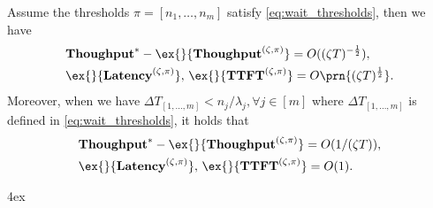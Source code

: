 \documentclass[opre,dblanonrev]{informs4}
\let\enotesize=\normalsize
\newcommand{\throughput}{\textbf{Thoughput}}
\newcommand{\Latency}{\textbf{Latency}}
\newcommand{\TTFT}{\textbf{TTFT}}
\begin{document}
\begin{theorem}
\label{thm:wait_heavy_traffic}
    Assume the thresholds $\pi=[n_1,\dots,n_m]$ satisfy \eqref{eq:wait_thresholds}, then we have 
$$
\begin{aligned}
    &\throughput^*-\ex{}{\throughput^{(\zeta,\pi)}}=O((\zeta T)^{-\frac{1}{2}}),\\ 
&\ex{}{\Latency^{(\zeta,\pi)}},\,\ex{}{\TTFT^{(\zeta,\pi)}}=O\prn{(\zeta T)^{\frac{1}{2}}}.
\end{aligned}
$$
    Moreover, when we have $\Delta T_{[1,\dots,m]}<n_j/\lambda_j,\forall j\in[m]$ where $\Delta T_{[1,\dots,m]}$ is defined in \eqref{eq:wait_thresholds}, it holds that
$$    \begin{aligned}
        &\throughput^* - \ex{}{\throughput^{(\zeta,\pi)}} = O(1/(\zeta T)), \\ 
&\ex{}{\Latency^{(\zeta,\pi)}},\, \ex{}{\TTFT^{(\zeta,\pi)}} = O(1).
    \end{aligned}$$
\end{theorem}



















\begingroup \parindent 0pt \parskip 4ex \def\enotesize{\normalsize} 
\theendnotes 
\endgroup

%
%
%
\end{document}
